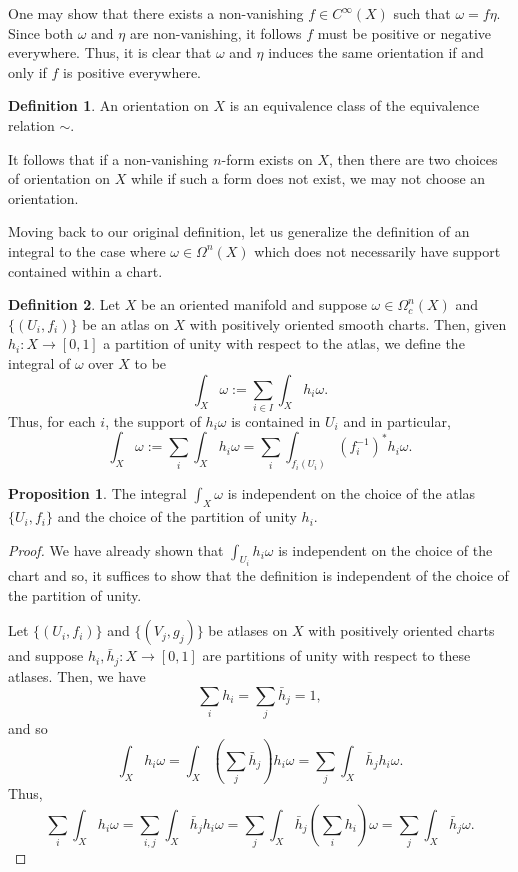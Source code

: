 \documentclass[]{article}
\theoremstyle{definition}
\theoremstyle{definition}
\newtheorem{definition}{Definition}[section]
\newtheorem{proposition}{Proposition}[section]
\begin{document}
One may show that there exists a non-vanishing \(f \in C^\infty(X)\) such that 
\(\omega = f\eta\). Since both \(\omega\) and \(\eta\) are non-vanishing, it 
follows \(f\) must be positive or negative everywhere. Thus, it is clear that 
\(\omega\) and \(\eta\) induces the same orientation if and only if \(f\) is 
positive everywhere. 

\begin{definition}
  An orientation on \(X\) is an equivalence class of the equivalence relation 
  \(\sim\).
\end{definition}

It follows that if a non-vanishing \(n\)-form exists on \(X\), then there 
are two choices of orientation on \(X\) while if such a form does not exist, 
we may not choose an orientation. 

Moving back to our original definition, let us generalize the definition of an 
integral to the case where \(\omega \in \Omega^n(X)\) which does not necessarily 
have support contained within a chart.

\begin{definition}
  Let \(X\) be an oriented manifold and suppose \(\omega \in \Omega^n_c(X)\) and 
  \(\{(U_i, f_i)\}\) be an atlas on \(X\) with positively oriented smooth charts. 
  Then, given \(h_i : X \to [0, 1]\) a partition of unity with respect to the 
  atlas, we define the integral of \(\omega\) over \(X\) to be 
  \[\int_X \omega := \sum_{i \in I} \int_X h_i \omega.\]
  Thus, for each \(i\), the support of \(h_i\omega\) is contained in \(U_i\) 
  and in particular, 
  \[\int_X \omega := \sum_i \int_X h_i \omega = \sum_i \int_{f_i(U_i)} (f_i^{-1})^* h_i \omega.\]
\end{definition}

\begin{proposition}
  The integral \(\int_X \omega\) is independent on the choice of the atlas 
  \(\{U_i, f_i\}\) and the choice of the partition of unity \(h_i\).
\end{proposition}
\begin{proof}
  We have already shown that \(\int_{U_i} h_i\omega\) is independent on the 
  choice of the chart and so, it suffices to show that the definition is 
  independent of the choice of the partition of unity.

  Let \(\{(U_i, f_i)\}\) and \(\{(V_j, g_j)\}\) be atlases on \(X\) with 
  positively oriented charts and suppose \(h_i, \bar h_j : X \to [0, 1]\) are 
  partitions of unity with respect to these atlases. Then, we have 
  \[\sum_i h_i = \sum_j \bar h_j = 1,\]
  and so 
  \[\int_X h_i \omega = \int_X \left(\sum_j \bar h_j\right) h_i \omega = 
  \sum_j \int_X \bar h_j h_i \omega.\]
  Thus, 
  \[\sum_i \int_X h_i \omega = \sum_{i, j}\int_X \bar h_j h_i \omega = 
  \sum_j \int_X \bar h_j \left(\sum_i h_i\right)\omega = \sum_j \int_X \bar h_j \omega.\]
\end{proof}
\end{document}

